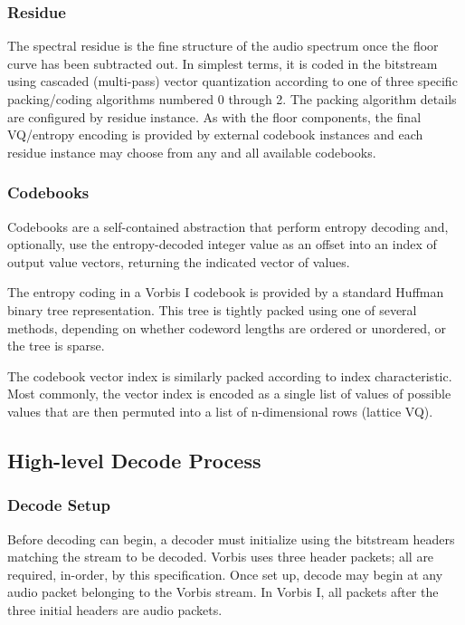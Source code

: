 \subsubsection{Residue}
The spectral residue is the fine structure of the audio spectrum
once the floor curve has been subtracted out.  In simplest terms, it
is coded in the bitstream using cascaded (multi-pass) vector
quantization according to one of three specific packing/coding
algorithms numbered 0 through 2.  The packing algorithm details are
configured by residue instance.  As with the floor components, the
final VQ/entropy encoding is provided by external codebook instances
and each residue instance may choose from any and all available
codebooks.

\subsubsection{Codebooks}

Codebooks are a self-contained abstraction that perform entropy
decoding and, optionally, use the entropy-decoded integer value as an
offset into an index of output value vectors, returning the indicated
vector of values.

The entropy coding in a Vorbis I codebook is provided by a standard
Huffman binary tree representation.  This tree is tightly packed using
one of several methods, depending on whether codeword lengths are
ordered or unordered, or the tree is sparse.

The codebook vector index is similarly packed according to index
characteristic.  Most commonly, the vector index is encoded as a
single list of values of possible values that are then permuted into
a list of n-dimensional rows (lattice VQ).



\subsection{High-level Decode Process}

\subsubsection{Decode Setup}

Before decoding can begin, a decoder must initialize using the
bitstream headers matching the stream to be decoded.  Vorbis uses
three header packets; all are required, in-order, by this
specification. Once set up, decode may begin at any audio packet
belonging to the Vorbis stream. In Vorbis I, all packets after the
three initial headers are audio packets.

